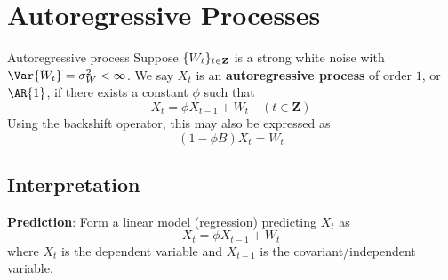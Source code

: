 \section{Autoregressive Processes}
\begin{Definition}{Autoregressive process}{}
    Suppose $ \{W_t\}_{t\in\mathbf{Z}} $ is a strong
    white noise with $ \Var{W_t}=\sigma_W^2<\infty $. We say
    $ X_t $ is an \textbf{autoregressive process}
    of order $ 1 $, or $ \AR{1} $, if there
    exists a constant $ \phi $ such that
    \[ X_t=\phi X_{t-1}+W_t\quad (t\in\mathbf{Z}) \]
    Using the backshift operator, this may also be expressed as
    \[ (1-\phi B)X_t=W_t \]
\end{Definition}
\subsection*{Interpretation}
\textbf{Prediction}: Form a linear model (regression)
predicting $ X_t $ as
\[ X_t=\phi X_{t-1}+W_t \]
where $ X_t $ is the dependent variable
and $ X_{t-1} $ is the covariant/independent variable.

